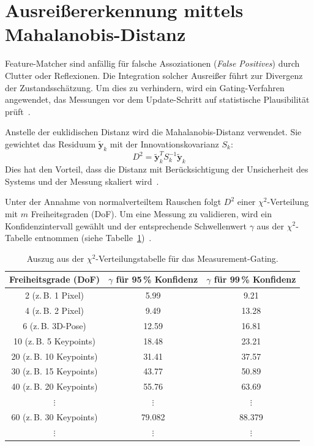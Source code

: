 \newpage
\section{Ausreißererkennung mittels Mahalanobis-Distanz}
\label{sec:MahalanobisGating}
Feature-Matcher sind anfällig für falsche Assoziationen (\textit{False Positives}) durch Clutter oder Reflexionen. Die Integration solcher Ausreißer führt zur Divergenz der Zustandsschätzung. Um dies zu verhindern, wird ein Gating-Verfahren angewendet, das Messungen vor dem Update-Schritt auf statistische Plausibilität prüft~\cite{thrun2005probabilistic, collins1992efficient}.

Anstelle der euklidischen Distanz wird die Mahalanobis-Distanz verwendet. Sie gewichtet das Residuum $\tilde{\mathbf{y}}_k$ mit der Innovationskovarianz $S_k$:
\begin{equation}
    D^2 = \tilde{\mathbf{y}}_k^T S_k^{-1} \tilde{\mathbf{y}}_k
\end{equation}
Dies hat den Vorteil, dass die Distanz mit Berücksichtigung der Unsicherheit des Systems und der Messung skaliert wird~\cite{thrun2005probabilistic, durrant1990toward}.

Unter der Annahme von normalverteiltem Rauschen folgt $D^2$ einer $\chi^2$-Verteilung mit $m$ Freiheitsgraden (\ac{DoF}). Um eine Messung zu validieren, wird ein Konfidenzintervall gewählt und der entsprechende Schwellenwert $\gamma$ aus der $\chi^2$-Tabelle entnommen (siehe Tabelle~\ref{tab:chi_square})~\cite{bar2001estimation}.

\begin{table}[htpb]
    \centering
    \begin{tabular}{c c c}
        \toprule
        \textbf{Freiheitsgrade (\ac{DoF})} & $\gamma$ \textbf{für 95\,\% Konfidenz} & $\gamma$ \textbf{für 99\,\% Konfidenz} \\
        \midrule
        2 (z.\,B. 1 Pixel) & 5.99 & 9.21 \\
        4 (z.\,B. 2 Pixel) & 9.49 & 13.28 \\
        6 (z.\,B. 3D-Pose) & 12.59 & 16.81 \\
        10 (z.\,B. 5 Keypoints) & 18.48 & 23.21 \\
        20 (z.\,B. 10 Keypoints) & 31.41 & 37.57 \\
        30 (z.\,B. 15 Keypoints) & 43.77 & 50.89 \\
        40 (z.\,B. 20 Keypoints) & 55.76 & 63.69 \\
        $\vdots$ & $\vdots$ & $\vdots$ \\
        60 (z.\,B. 30 Keypoints) & 79.082 & 88.379 \\
        $\vdots$ & $\vdots$ & $\vdots$ \\
        \bottomrule
    \end{tabular}
    \caption{Auszug aus der $\chi^2$-Verteilungstabelle für das Measurement-Gating.}
    \label{tab:chi_square}
\end{table}

